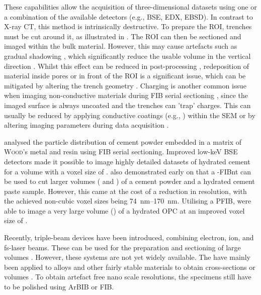 These capabilities allow the acquisition of three-dimensional datasets using one or a combination of the available detectors (e.g., \ac{BSE}, \ac{EDX}, \ac{EBSD}).
In contrast to X-ray \ac{CT}, this method is intrinsically destructive.
To prepare the \ac{ROI}, trenches must be cut around it, as illustrated in .
The \ac{ROI} can then be sectioned and imaged within the bulk material.
However, this may cause artefacts such as gradual shadowing \cite{joos.2011,taillon.2018,fager.2020}, which significantly reduce the usable volume in the vertical direction \cite{jiang.2023}.
Whilst this effect can be reduced in post-processing \cite{taillon.2018}, redeposition of material inside pores or in front of the \ac{ROI} is a significant issue, which can be mitigated by altering the trench geometry \cite{fager.2020}.
Charging is another common issue when imaging non-conductive materials during \ac{FIB} serial sectioning \cite{fager.2020}, since the imaged surface is always uncoated and the trenches can 'trap' charges.
This can usually be reduced by applying conductive coatings (e.g., ) within the \ac{SEM} or by altering imaging parameters during data acquisition \cite{fager.2020}.

\textcite{holzer.2006, munch.2006} analysed the particle distribution of cement powder embedded in a matrix of \textsc{Wood}'s metal and resin using \ac{FIB} serial sectioning.
Improved low-keV \ac{BSE} detectors made it possible to image highly detailed datasets of hydrated cement for a  volume with a voxel size of  \cite{trtik.2011}.
\textcite{munch.2006, holzer.2006a} also demonstrated early on that a -\ac{FIBnt} can be used to cut larger volumes ( and ) of a cement powder and a hydrated cement paste sample.
However, this came at the cost of a reduction in resolution, with the achieved non-cubic voxel sizes being \qtyrange{74}{170}{\nano\meter}.
Utilising a \ac{PFIB}, \textcite{dong.2022} were able to image a very large volume () of a hydrated \ac{OPC} at an improved voxel size of .

Recently, triple-beam devices have been introduced, combining electron, ion, and \ac{fs-laser} beams.
These can be used for the preparation and sectioning of large volumes \cite{gholinia.2024}.
However, these systems are not yet widely available.
The have mainly been applied to alloys and other fairly stable materials to obtain cross-sections or volumes \cite{gholinia.2024}.
To obtain artefact free nano scale resolutions, the specimens still have to be polished using \ac{ArBIB} or \ac{FIB}.

